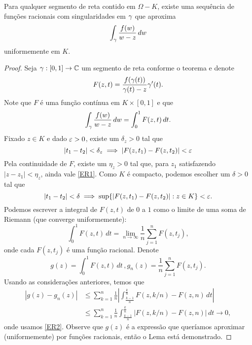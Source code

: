     \begin{lema}
    \label{LR2}
        Para qualquer segmento de reta contido em $\Omega - K$, existe uma sequência 
        de funções racionais com singularidades em $\gamma$ que aproxima
        \begin{equation*}
        \int_\gamma \frac{f(w)}{w-z}\,dw
        \end{equation*}
        uniformemente em $K$.
    \end{lema}
    \begin{proof}
        Seja $\gamma : [0,1] \to \mathbb{C}$ um segmento de reta conforme o teorema e denote
        \begin{equation*}
            F(z,t) = \frac{f(\gamma(t))}{\gamma(t) - z}\gamma'(t).
        \end{equation*}
        Note que $F$ é uma função contínua em $K \times [0,1]$ e que
        \begin{equation*}
            \int_\gamma \frac{f(w)}{w-z}\,dw = \int_{0}^{1}F(z,t)\,dt.
        \end{equation*}
        Fixado $z \in K$ e dado $\varepsilon > 0$, existe um $\delta_z > 0$ tal que
        \begin{equation}
        \label{ER1}
            |t_1 - t_2| < \delta_z \implies |F(z,t_1) - F(z,t_2)| < \varepsilon
        \end{equation}
        Pela continuidade de $F$, existe um $\eta_z > 0$ tal que, para $z_1$ satisfazendo 
        $|z-z_1| < \eta_z$, ainda vale \eqref{ER1}. Como $K$ é compacto, podemos escolher 
        um $\delta > 0$ tal que
        \begin{equation}
        \label{ER2}
            |t_1 - t_2| < \delta \implies \sup \{|F(z,t_1) - F(z,t_2)| : z \in K\} < \varepsilon.   
        \end{equation}
        Podemos escrever a integral de $F(z,t)$ de $0$ a $1$ como o limite de uma soma de Riemann 
        (que converge uniformemente):
        \begin{equation*}
            \int_{0}^{1}F(z,t) \, dt = \lim_{n \to \infty}\frac{1}{n}\sum_{j=1}^{n}F(z,t_j),
        \end{equation*}
        onde cada $F(z,t_j)$ é uma função racional. Denote
        \begin{equation*}
            g(z) = \int_{0}^{1}F(z,t) \, dt \, , g_n(z) = \frac{1}{n}\sum_{j=1}^{n}F(z,t_j).
        \end{equation*}
        Usando as considerações anteriores, temos que 
        \begin{align*}
            |g(z) - g_n(z)| 
            &\leq 
            \sum_{k=1}^{n}\frac{1}{n}\left|\int_{\frac{k-1}{n}}^{\frac{k}{n}}F(z,k/n) - F(z,n) \, dt \right| \\
            &\leq \sum_{k=1}^{n}\frac{1}{n}\int_{\frac{k-1}{n}}^{\frac{k}{n}}|F(z,k/n) - F(z,n)| \, dt
            \to 0,
        \end{align*}
        onde usamos \eqref{ER2}. Observe que $g(z)$ é a expressão que queríamos aproximar
        (uniformemente) por funções racionais, então o Lema está demonstrado.
    \end{proof}
